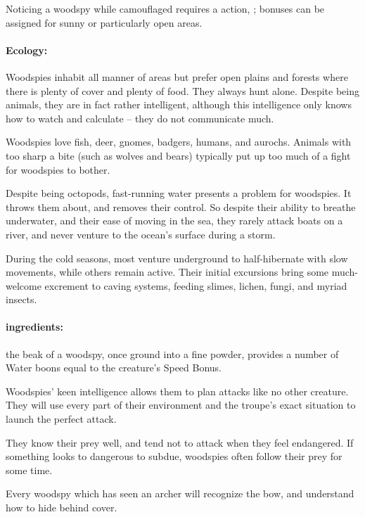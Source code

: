 \begin{multicols}{2}
Noticing a woodspy while camouflaged requires a  action, \tn[14]; bonuses can be assigned for sunny or particularly open areas.

\woodspy

\paragraph{Ecology:} Woodspies inhabit all manner of areas but prefer open plains and forests where there is plenty of cover and plenty of food.  They always hunt alone.  Despite being animals, they are in fact rather intelligent, although this intelligence only knows how to watch and calculate -- they do not communicate much.

Woodspies love fish, deer, gnomes, badgers, humans, and aurochs.
Animals with too sharp a bite (such as wolves and bears) typically put up too much of a fight for woodspies to bother.

Despite being octopods, fast-running water presents a problem for woodspies.
It throws them about, and removes their control.
So despite their ability to breathe underwater, and their ease of moving in the sea, they rarely attack boats on a river, and never venture to the ocean's surface during a storm.

During the cold seasons, most venture underground to half-hibernate with slow movements, while others remain active.
Their initial excursions bring some much-welcome excrement to caving systems, feeding slimes, lichen, fungi, and myriad insects.

\paragraph{\Glspl{ingredient}:}
the beak of a woodspy, once ground into a fine powder, provides a number of Water \glspl{boon} equal to the creature's Speed Bonus.

\showEnc[E]

Woodspies' keen intelligence allows them to plan attacks like no other creature.
They will use every part of their environment and the troupe's exact situation to launch the perfect attack.

They know their prey well, and tend not to attack when they feel endangered.
If something looks to dangerous to subdue, woodspies often follow their prey for some time.

Every woodspy which has seen an archer will recognize the bow, and understand how to hide behind cover.


\end{multicols}
